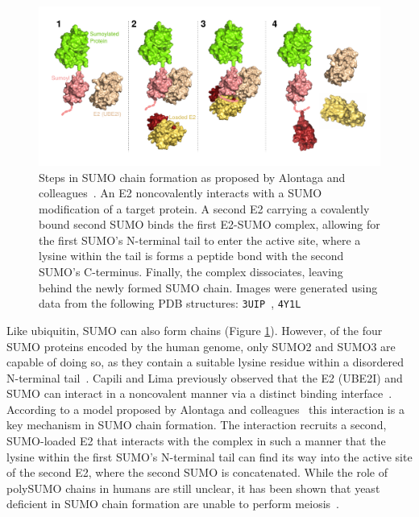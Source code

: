 \begin{figure}[h!]
	\centering
	\includegraphics[width=\textwidth]{img/sumo_chaining.pdf}
	\caption{Steps in SUMO chain formation as proposed by Alontaga and colleagues~\cite{alontaga_rwd_2015}. An E2 noncovalently interacts with a SUMO modification of a target protein. A second E2 carrying a covalently bound second SUMO binds the first E2-SUMO complex, allowing for the first SUMO's N-terminal tail to enter the active site, where a lysine within the tail is forms a peptide bond with the second SUMO's C-terminus. Finally, the complex dissociates, leaving behind the newly formed SUMO chain. Images were generated using data from the following PDB structures: \texttt{3UIP}~\cite{gareau_determinants_2012}, \texttt{4Y1L}~\cite{alontaga_rwd_2015}}
	\label{fig:sumo_chaining}
\end{figure}

Like ubiquitin, SUMO can also form chains (Figure \ref{fig:sumo_chaining}). However, of the four SUMO proteins encoded by the human genome, only SUMO2 and SUMO3 are capable of doing so, as they contain a suitable lysine residue within a disordered N-terminal tail~\cite{tatham_polymeric_2001}. Capili and Lima previously observed that the E2 (UBE2I) and SUMO can interact in a noncovalent manner via a distinct binding interface~\cite{capili_structure_2007}. According to a model proposed by Alontaga and colleagues~\cite{alontaga_rwd_2015} this interaction is a key mechanism in SUMO chain formation. The interaction recruits a second, SUMO-loaded E2 that interacts with the complex in such a manner that the lysine within the first SUMO's N-terminal tail can find its way into the active site of the second E2, where the second SUMO is concatenated. While the role of polySUMO chains in humans are still unclear, it has been shown that yeast deficient in SUMO chain formation are unable to perform meiosis~\cite{cheng_sumo_2006}.

